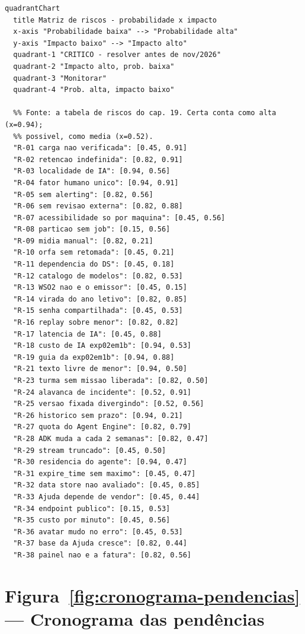 \begin{lstlisting}[language=mermaid]
quadrantChart
  title Matriz de riscos - probabilidade x impacto
  x-axis "Probabilidade baixa" --> "Probabilidade alta"
  y-axis "Impacto baixo" --> "Impacto alto"
  quadrant-1 "CRITICO - resolver antes de nov/2026"
  quadrant-2 "Impacto alto, prob. baixa"
  quadrant-3 "Monitorar"
  quadrant-4 "Prob. alta, impacto baixo"

  %% Fonte: a tabela de riscos do cap. 19. Certa conta como alta (x=0.94);
  %% possivel, como media (x=0.52).
  "R-01 carga nao verificada": [0.45, 0.91]
  "R-02 retencao indefinida": [0.82, 0.91]
  "R-03 localidade de IA": [0.94, 0.56]
  "R-04 fator humano unico": [0.94, 0.91]
  "R-05 sem alerting": [0.82, 0.56]
  "R-06 sem revisao externa": [0.82, 0.88]
  "R-07 acessibilidade so por maquina": [0.45, 0.56]
  "R-08 particao sem job": [0.15, 0.56]
  "R-09 midia manual": [0.82, 0.21]
  "R-10 orfa sem retomada": [0.45, 0.21]
  "R-11 dependencia do DS": [0.45, 0.18]
  "R-12 catalogo de modelos": [0.82, 0.53]
  "R-13 WSO2 nao e o emissor": [0.45, 0.15]
  "R-14 virada do ano letivo": [0.82, 0.85]
  "R-15 senha compartilhada": [0.45, 0.53]
  "R-16 replay sobre menor": [0.82, 0.82]
  "R-17 latencia de IA": [0.45, 0.88]
  "R-18 custo de IA exp02em1b": [0.94, 0.53]
  "R-19 guia da exp02em1b": [0.94, 0.88]
  "R-21 texto livre de menor": [0.94, 0.50]
  "R-23 turma sem missao liberada": [0.82, 0.50]
  "R-24 alavanca de incidente": [0.52, 0.91]
  "R-25 versao fixada divergindo": [0.52, 0.56]
  "R-26 historico sem prazo": [0.94, 0.21]
  "R-27 quota do Agent Engine": [0.82, 0.79]
  "R-28 ADK muda a cada 2 semanas": [0.82, 0.47]
  "R-29 stream truncado": [0.45, 0.50]
  "R-30 residencia do agente": [0.94, 0.47]
  "R-31 expire_time sem maximo": [0.45, 0.47]
  "R-32 data store nao avaliado": [0.45, 0.85]
  "R-33 Ajuda depende de vendor": [0.45, 0.44]
  "R-34 endpoint publico": [0.15, 0.53]
  "R-35 custo por minuto": [0.45, 0.56]
  "R-36 avatar mudo no erro": [0.45, 0.53]
  "R-37 base da Ajuda cresce": [0.82, 0.44]
  "R-38 painel nao e a fatura": [0.82, 0.56]
\end{lstlisting}

\section{Figura~\ref{fig:cronograma-pendencias} --- Cronograma das pendências}

